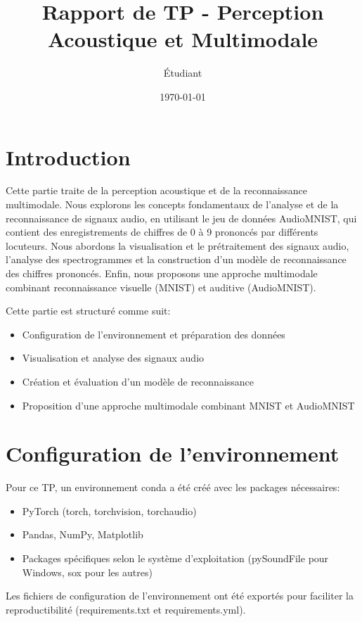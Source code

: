 \documentclass[11pt,a4paper]{article}
\title{Rapport de TP - Perception Acoustique et Multimodale}
\author{Étudiant}
\date{\today}
\begin{document}
\maketitle

\tableofcontents

\section{Introduction}
\label{sec:introduction}

Cette partie traite de la perception acoustique et de la reconnaissance multimodale. Nous explorons les concepts fondamentaux de l'analyse et de la reconnaissance de signaux audio, en utilisant le jeu de données AudioMNIST, qui contient des enregistrements de chiffres de 0 à 9 prononcés par différents locuteurs. Nous abordons la visualisation et le prétraitement des signaux audio, l'analyse des spectrogrammes et la construction d'un modèle de reconnaissance des chiffres prononcés. Enfin, nous proposons une approche multimodale combinant reconnaissance visuelle (MNIST) et auditive (AudioMNIST).

Cette partie est structuré comme suit:
\begin{itemize}
    \item Configuration de l'environnement et préparation des données
    \item Visualisation et analyse des signaux audio
    \item Création et évaluation d'un modèle de reconnaissance
    \item Proposition d'une approche multimodale combinant MNIST et AudioMNIST
\end{itemize}

\section{Configuration de l'environnement}
\label{sec:config}

Pour ce TP, un environnement conda a été créé avec les packages nécessaires:
\begin{itemize}
    \item PyTorch (torch, torchvision, torchaudio)
    \item Pandas, NumPy, Matplotlib
    \item Packages spécifiques selon le système d'exploitation (pySoundFile pour Windows, sox pour les autres)
\end{itemize}

Les fichiers de configuration de l'environnement ont été exportés pour faciliter la reproductibilité (requirements.txt et requirements.yml). 
\end{document}
